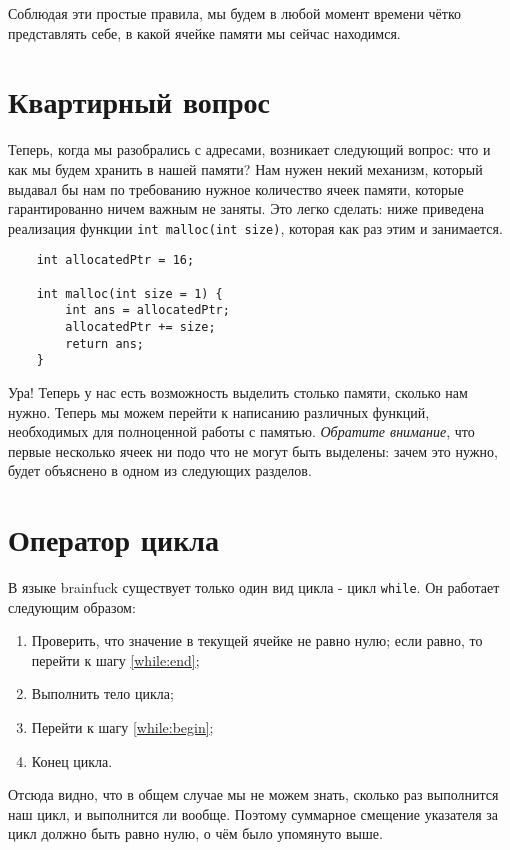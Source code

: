 \documentclass{book}
\begin{document}
Соблюдая эти простые правила, мы будем в любой момент времени чётко представлять себе,
в какой ячейке памяти мы сейчас находимся.

\section{Квартирный вопрос}
Теперь, когда мы разобрались с адресами, возникает следующий вопрос: что и как мы будем
хранить в нашей памяти? Нам нужен некий механизм, который выдавал бы нам по требованию
нужное количество ячеек памяти, которые гарантированно ничем важным не заняты. Это легко сделать:
ниже приведена реализация функции \texttt{int malloc(int size)}, которая как раз этим
и занимается.

\begin{verbatim}
    int allocatedPtr = 16;

    int malloc(int size = 1) {
        int ans = allocatedPtr;
        allocatedPtr += size;
        return ans;
    }
\end{verbatim}

Ура! Теперь у нас есть возможность выделить столько памяти, сколько нам нужно. Теперь мы
можем перейти к написанию различных функций, необходимых для полноценной работы с памятью.
{\em Обратите внимание}, что первые несколько ячеек ни подо что не могут быть выделены: зачем это
нужно, будет объяснено в одном из следующих разделов.

\section{Оператор цикла}
В языке brainfuck существует только один вид цикла - цикл \texttt{while}. Он работает следующим
образом: 

\begin{enumerate}
    \item Проверить, что значение в текущей ячейке не равно нулю;
        если равно, то перейти к шагу \ref{while:end}; \label{while:begin}
    \item Выполнить тело цикла;
    \item Перейти к шагу \ref{while:begin};
    \item Конец цикла. \label{while:end}
\end{enumerate}

Отсюда видно, что в общем случае мы не можем знать, сколько раз выполнится наш цикл, и выполнится
ли вообще. Поэтому суммарное смещение указателя за цикл должно быть равно нулю, о чём было упомянуто
выше. 
\end{document}
